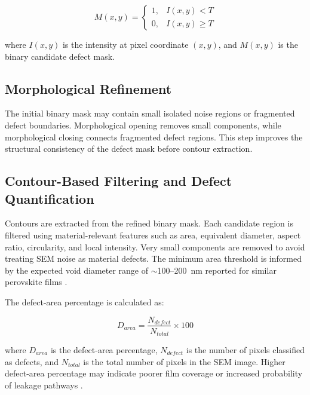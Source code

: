 \documentclass[pdflatex,sn-mathphys-num,iicol]{sn-jnl}
\theoremstyle{thmstyleone}
\theoremstyle{thmstyletwo}
\theoremstyle{thmstylethree}
\begin{document}
\begin{equation}
M(x,y)=
\begin{cases}
1, & I(x,y)<T \\
0, & I(x,y)\geq T
\end{cases}
\label{eq:mask}
\end{equation}

where $I(x,y)$ is the intensity at pixel coordinate $(x,y)$, and
$M(x,y)$ is the binary candidate defect mask.

\subsection{Morphological Refinement}
\label{subsec:morphological_refinement}

The initial binary mask may contain small isolated noise regions or
fragmented defect boundaries. Morphological opening removes small
components, while morphological closing connects fragmented defect
regions. This step improves the structural consistency of the defect
mask before contour extraction.

\subsection{Contour-Based Filtering and Defect Quantification}
\label{subsec:contour_filtering}

Contours are extracted from the refined binary mask. Each candidate
region is filtered using material-relevant features such as area,
equivalent diameter, aspect ratio, circularity, and local intensity.
Very small components are removed to avoid treating SEM noise as
material defects. The minimum area threshold is informed by the
expected void diameter range of $\sim$100--200~nm reported for
similar perovskite films \cite{chang2026}.

The defect-area percentage is calculated as:

\begin{equation}
D_{area} = \frac{N_{defect}}{N_{total}} \times 100
\label{eq:defect_area}
\end{equation}

where $D_{area}$ is the defect-area percentage, $N_{defect}$ is the
number of pixels classified as defects, and $N_{total}$ is the total
number of pixels in the SEM image. Higher defect-area percentage may
indicate poorer film coverage or increased probability of leakage
pathways \cite{chang2026,hu2023}.

\end{document}
